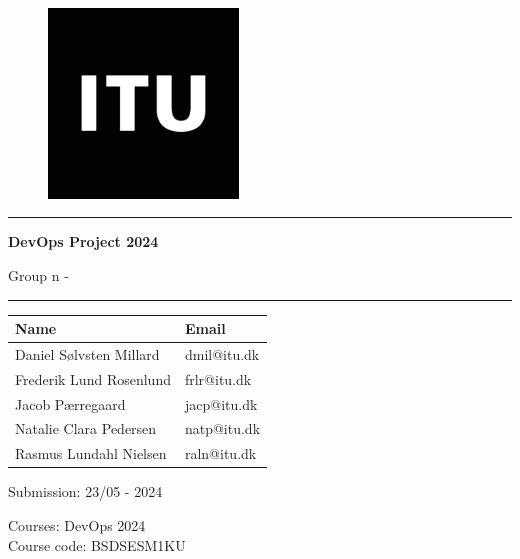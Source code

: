 \begin{titlepage}
\begin{center}
\newcommand{\quickcharcount}[1]{%
  \immediate\write18{texcount -1 -sum -merge -char -q #1.tex output.bbl > #1-chars.sum }%
}
\vspace{1cm}
\begin{figure}
        \centering
        \includegraphics[width=0.45\textwidth]{Images/itu_logo.png} %
\end{figure}

\vspace{1cm}

\hrule
\vspace{.5cm}
{\huge \bfseries DevOps Project 2024 
\vspace{.25cm}

Group n - \titleDocument}
\vspace{.5cm}

\hrule
\vspace{1cm}

\centering

\begin{center}
\setlength{\tabcolsep}{30pt}
\renewcommand{\arraystretch}{1.2}
\begin{tabular}{ll}
    \Large{Name} & \Large{Email} \\\hline
    Daniel Sølvsten Millard & dmil@itu.dk \\
    Frederik Lund Rosenlund & frlr@itu.dk \\
    Jacob Pærregaard & jacp@itu.dk \\
    Natalie Clara Pedersen & natp@itu.dk \\
    Rasmus Lundahl Nielsen & raln@itu.dk \\
\end{tabular}
\end{center}

\vspace{1.5cm}

Submission: 23/05 - 2024 %

\vspace{.5cm} 

Courses: DevOps 2024 \\
Course code: BSDSESM1KU \\
\vspace{.5cm}

\end{center}
\end{titlepage}